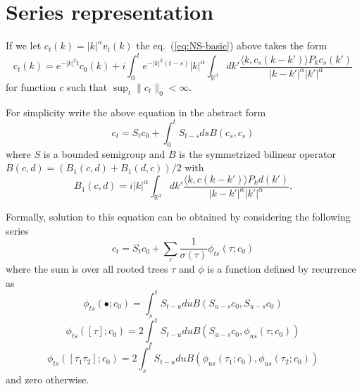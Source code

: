 \documentclass[a4paper,12pt,reqno]{amsart}
\newcommand{\hd}{\hat \delta}
\newcommand{\1}{{\bf 1}}
\newcommand{\RR}{\mathbb{R}}
\newcommand{\troot}{\bullet}
\begin{document}
\section{Series representation}
\label{sec:series}
If we let $c_t(k) = |k|^\alpha v_t(k)$ the eq.~(\ref{eq:NS-basic}) above takes the form
\begin{equation}
  \label{eq:NS-c}
c_t(k) = e^{-|k|^2 t} c_0(k) + i \int_0^t e^{-|k|^2 (t-s)} |k|^\alpha
\int_{\RR^3}dk' \frac{\langle k, c_s(k-k')\rangle P_k
c_s(k')}{|k-k'|^{\alpha} |k'|^{\alpha}} 
\end{equation}
for function $c$ such that $\sup_t \|c_t\|_0 < \infty$.

For simplicity write the above equation in the abstract form
\begin{equation}
  \label{eq:NS-c-abstract}
c_t = S_t c_0 +  \int_0^t S_{t-s} ds B(c_s,c_s)
\end{equation}
where $S$ is a bounded semigroup and $B$ is the symmetrized bilinear operator
 $ B(c,d) = (B_1(c,d) + B_1(d,c))/2$ with
$$
B_1(c,d) = i  |k|^\alpha
\int_{\RR^3}dk' \frac{\langle k, c(k-k')\rangle P_k
d(k')}{|k-k'|^{\alpha} |k'|^{\alpha}}. 
$$

Formally, solution to this equation can be obtained by considering the
following series
\begin{equation}
  \label{eq:1}
c_t = S_{t} c_0 + \sum_{\tau} \frac{1}{\sigma(\tau)} \phi_{ts}(\tau;c_0)   
\end{equation}
where the sum is over all rooted  trees $\tau$ and $\phi$ is a function
defined by recurrence as
\begin{equation}
  \label{eq:3}
\phi_{ts}(\troot;c_0) = \int_s^t S_{t-u} du B(S_{u-s}c_0,S_{u-s}c_0)  
\end{equation}
\begin{equation}
  \label{eq:3b}
\phi_{ts}([\tau];c_0) = 2 \int_s^t S_{t-u} du B(S_{u-s}c_0,\phi_{us}(\tau;c_0))  
\end{equation}
\begin{equation}
  \label{eq:3c}
\phi_{ts}([\tau_1 \tau_2];c_0) = 2 \int_s^t S_{t-u} du
B(\phi_{us}(\tau_1;c_0), \phi_{us}(\tau_2;c_0))  
\end{equation}
and zero otherwise.
\end{document}
